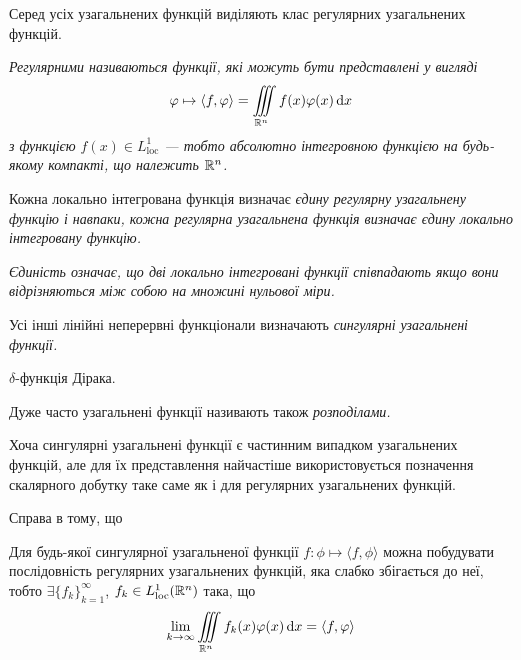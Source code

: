 Серед усіх узагальнених функцій виділяють клас регулярних узагальнених функцій.
\begin{definition}
	\it{Регулярними} називаються функції, які можуть бути представлені у вигляді 
	\begin{equation}
		\phi \mapsto \langle f, \phi \rangle = \Iiint_{\RR^n} f(x) \phi(x) \diff x
	\end{equation}
	з функцією $f(x) \in L_{\text{loc}}^1$ --- тобто абсолютно інтегровною функцією на будь-якому компакті, що належить $\mathbb{R}^n$.
\end{definition}

\begin{remark}
	Кожна локально інтегрована функція визначає \it{єдину} регулярну узагальнену функцію і навпаки, кожна регулярна узагальнена функція визначає \it{єдину} локально інтегровану функцію. 
\end{remark}

\begin{remark}
	\it{Єдиність} означає, що дві локально інтегровані функції співпадають якщо вони відрізняються між собою на множині нульової міри.
\end{remark}

\begin{definition}
	Усі інші лінійні неперервні функціонали визначають \it{сингулярні} узагальнені функції.
\end{definition}

\begin{example}
	$\delta$-функція Дірака.
\end{example}

\begin{remark}
	Дуже часто узагальнені функції називають також \it{розподілами}.
\end{remark}

Хоча сингулярні узагальнені функції є частинним випадком узагальнених функцій, але для їх представлення найчастіше використовується позначення скалярного добутку таке саме як і для регулярних узагальнених функцій. \medskip

Справа в тому, що 
\begin{proposition}
	Для будь-якої сингулярної узагальненої функції $f: \phi \mapsto \langle f, \phi \rangle$ можна побудувати послідовність регулярних узагальнених функцій, яка слабко збігається до неї, тобто $\exists \{f_k\}_{k = 1}^\infty$, $f_k \in L_{\text{loc}}^1(\mathbb{R}^n)$ така, що
	\begin{equation}
		\Lim_{k \to \infty} \Iiint_{\RR^n} f_k(x) \phi(x) \diff x = \langle f, \phi \rangle
	\end{equation}
\end{proposition}

